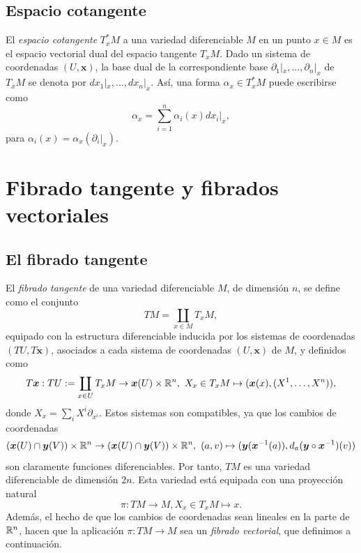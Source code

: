 \documentclass[11pt,a4paper]{amsbook}
\theoremstyle{remark} \newtheorem{rmk}[subsection]{Observación}
\theoremstyle{definition} \newtheorem{defn}[subsection]{Definición}
\theoremstyle{definition} \newtheorem{ex}[subsection]{Ejemplo}
\theoremstyle{definition} \newtheorem{ej}[subsection]{Ejercicio}
\begin{document}
\subsection{Espacio cotangente} El \emph{espacio cotangente} $T^*_xM$ a una variedad diferenciable $M$ en un punto $x\in M$ es el espacio vectorial dual del espacio tangente $T_xM$. Dado un sistema de coordenadas $(U,\bm{x})$, la base dual de la correspondiente base $\partial_{1}|_x,\dots, \partial_{n}|_x$ de $T_xM$ se denota por $dx_1|_x,\dots, dx_n|_x$. Así, una forma $\alpha_x \in T^*_xM$ puede escribirse como
\begin{equation*}
\alpha_x = \sum_{i=1}^n \alpha_i(x) dx_i|_x,
\end{equation*}
para $\alpha_i(x)=\alpha_x(\partial_i|_x)$.


\section{Fibrado tangente y fibrados vectoriales}
\subsection{El fibrado tangente} El \emph{fibrado tangente} de una variedad diferenciable $M$, de dimensión $n$, se define como el conjunto
\begin{equation*}
TM = \coprod_{x\in M} T_xM,
\end{equation*}
equipado con la estructura diferenciable inducida por los sistemas de coordenadas $(TU,T\bm{x})$, asociados a cada sistema de coordenadas $(U,\bm{x})$ de $M$, y definidos como
\begin{equation*}
T\bm{x}: TU:=\coprod_{x\in U} T_xM \rightarrow \bm{x}(U) \times \mathbb R^n,\  X_x \in T_x M \mapsto (\bm{x}(x),(X^1,\dots,X^n)),
\end{equation*}
donde $X_x=\sum_i X^i \partial_{x^i}$. Estos sistemas son compatibles, ya que los cambios de coordenadas
\begin{equation*}
(\bm{x}(U) \cap \bm{y}(V)) \times \mathbb R^n \rightarrow (\bm{x}(U) \cap \bm{y}(V)) \times \mathbb R^n, \  (a,v) \mapsto (\bm{y}(\bm{x}^{-1}(a)), d_a (\bm{y}\circ \bm{x}^{-1})(v))
\end{equation*}
son claramente funciones diferenciables. Por tanto, $TM$ es una variedad diferenciable de dimensión $2n$. Esta variedad está equipada con una proyección natural
\begin{equation*}
\pi: TM \rightarrow M, X_x \in T_xM \mapsto x.
\end{equation*}
Además, el hecho de que los cambios de coordenadas sean lineales en la parte de $\mathbb R^n$, hacen que la aplicación $\pi:TM\rightarrow M$ sea un \emph{fibrado vectorial}, que definimos a continuación.
\end{document}
